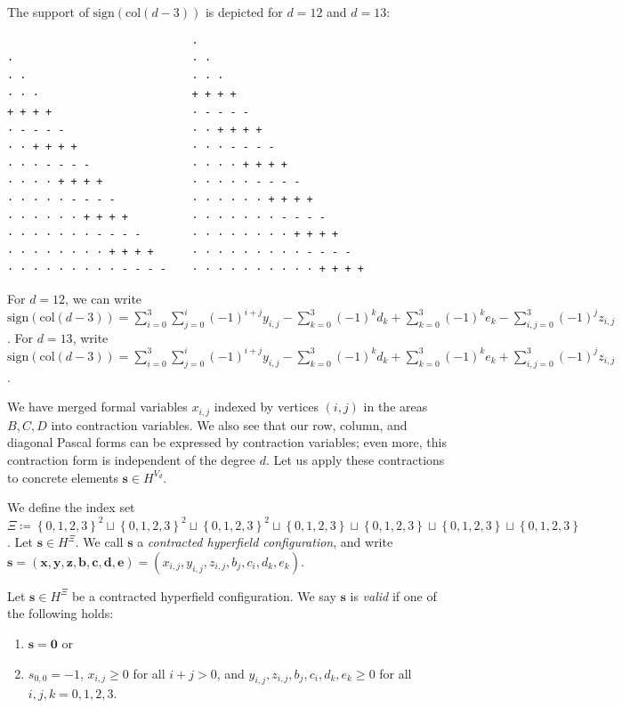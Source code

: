 \begin{example}
    The support of \( \mathrm{sign}(\mathrm{col}(d-3)) \) is depicted for \( d = 12 \) and \( d = 13 \):
    \begin{verbatim}
                             · 
·                            · ·    
· ·                          · · ·
· · ·                        + + + + 
+ + + +                      · - - - - 
· - - - -                    · · + + + + 
· · + + + +                  · · · - - - - 
· · · - - - -                · · · · + + + + 
· · · · + + + +              · · · · · - - - - 
· · · · · - - - -            · · · · · · + + + + 
· · · · · · + + + +          · · · · · · · - - - - 
· · · · · · · - - - -        · · · · · · · · + + + + 
· · · · · · · · + + + +      · · · · · · · · · - - - -
· · · · · · · · · - - - -    · · · · · · · · · · + + + +
    \end{verbatim}
    For \( d = 12 \), we can write \( \mathrm{sign}(\mathrm{col}(d-3)) = \sum^3_{i=0}\sum^i_{j=0} (-1)^{i+j}y_{i,j} - \sum^3_{k=0}(-1)^{k}d_k  + \sum^3_{k=0}(-1)^{k}e_k - \sum^3_{i,j=0}(-1)^{j}z_{i,j} \). For \( d = 13 \), write \( \mathrm{sign}(\mathrm{col}(d-3)) = \sum^3_{i=0}\sum^i_{j=0} (-1)^{i+j}y_{i,j} - \sum^3_{k=0}(-1)^{k}d_k  + \sum^3_{k=0}(-1)^{k}e_k + \sum^3_{i,j=0}(-1)^{j}z_{i,j} \).
\end{example}

We have merged formal variables \( x_{i,j} \) indexed by vertices \( (i,j) \) in the areas \( B, C, D \) into contraction variables. We also see that our row, column, and diagonal Pascal forms can be expressed by contraction variables; even more, this contraction form is independent of the degree \( d \). Let us apply these contractions to concrete elements \( \mathbf{s} \in H^{V_d} \).

\begin{definition}
    We define the index set \(  \Xi \coloneqq \left\{ 0,1,2,3 \right\}^2 \sqcup \left\{ 0,1,2,3 \right\}^2 \sqcup \left\{ 0,1,2,3 \right\}^2 \sqcup \left\{ 0,1,2,3 \right\} \sqcup \left\{ 0,1,2,3 \right\} \sqcup \left\{ 0,1,2,3 \right\} \sqcup \left\{ 0,1,2,3 \right\} \).
    Let \( \mathbf{s} \in H^{\Xi} \). We call \( \mathbf{s} \) a \emph{contracted hyperfield configuration}, and write \( \mathbf{s} = (\mathbf{x}, \mathbf{y}, \mathbf{z}, \mathbf{b}, \mathbf{c}, \mathbf{d}, \mathbf{e}) = (x_{i,j}, y_{i,j}, z_{i,j}, b_j, c_i, d_k, e_k) \).
\end{definition}

\begin{definition}
    Let \( \mathbf{s} \in H^{\Xi}\) be a {contracted hyperfield configuration}.
    We say \( \mathbf{s} \) is \emph{valid} if one of the following holds:
    \begin{enumerate}
        \item \( \mathbf{s} = \mathbf{0} \) or
        \item \( s_{0,0} = -1 \), \( x_{i,j} \geq 0 \) for all \( i+j > 0 \), and \(  y_{i,j}, z_{i,j}, b_j, c_i, d_k, e_k \geq 0 \) for all \( i,j,k = 0,1,2,3 \).
    \end{enumerate}
\end{definition}

